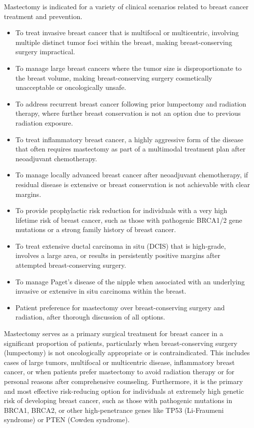 Mastectomy is indicated for a variety of clinical scenarios related to breast cancer treatment and prevention.

\begin{itemize}
  \item To treat invasive breast cancer that is multifocal or multicentric, involving multiple distinct tumor foci within the breast, making breast-conserving surgery impractical.
  \item To manage large breast cancers where the tumor size is disproportionate to the breast volume, making breast-conserving surgery cosmetically unacceptable or oncologically unsafe.
  \item To address recurrent breast cancer following prior lumpectomy and radiation therapy, where further breast conservation is not an option due to previous radiation exposure.
  \item To treat inflammatory breast cancer, a highly aggressive form of the disease that often requires mastectomy as part of a multimodal treatment plan after neoadjuvant chemotherapy.
  \item To manage locally advanced breast cancer after neoadjuvant chemotherapy, if residual disease is extensive or breast conservation is not achievable with clear margins.
  \item To provide prophylactic risk reduction for individuals with a very high lifetime risk of breast cancer, such as those with pathogenic BRCA1/2 gene mutations or a strong family history of breast cancer.
  \item To treat extensive ductal carcinoma in situ (DCIS) that is high-grade, involves a large area, or results in persistently positive margins after attempted breast-conserving surgery.
  \item To manage Paget's disease of the nipple when associated with an underlying invasive or extensive in situ carcinoma within the breast.
  \item Patient preference for mastectomy over breast-conserving surgery and radiation, after thorough discussion of all options.
\end{itemize}

Mastectomy serves as a primary surgical treatment for breast cancer in a significant proportion of patients, particularly when breast-conserving surgery (lumpectomy) is not oncologically appropriate or is contraindicated. This includes cases of large tumors, multifocal or multicentric disease, inflammatory breast cancer, or when patients prefer mastectomy to avoid radiation therapy or for personal reasons after comprehensive counseling. Furthermore, it is the primary and most effective risk-reducing option for individuals at extremely high genetic risk of developing breast cancer, such as those with pathogenic mutations in BRCA1, BRCA2, or other high-penetrance genes like TP53 (Li-Fraumeni syndrome) or PTEN (Cowden syndrome).

